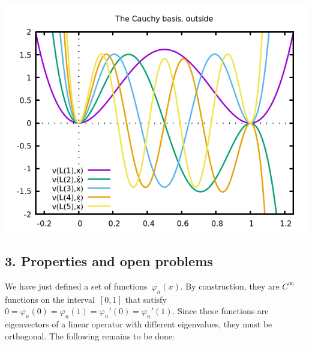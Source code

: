 \includegraphics{cauchy2.png}

\subsection{3. Properties and open problems}

We have just defined a set of functions~$\varphi_n(x)$.  By construction,
they are $C^\infty$ functions on the interval~$[0,1]$ that
satisfy~$0=\varphi_n(0)=\varphi_n(1)=\varphi_n'(0)=\varphi_n'(1)$.  Since
these functions are eigenvectors of a linear operator with different
eigenvalues, they must be orthogonal.  The following remains to be
done:

